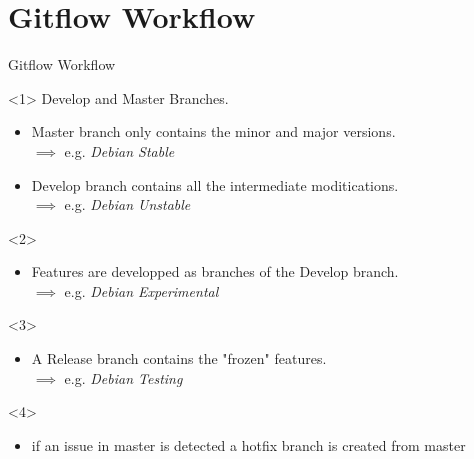 \documentclass[usenames,dvipsnames,9pt]{beamer}
\begin{document}
%
%
\section{Gitflow Workflow}

%
\begin{frame}[t]{Gitflow Workflow}
  \begin{center}

    \begin{onlyenv}<1>
      Develop and Master Branches.
      \begin{itemize}
        \item Master branch only contains the minor and major versions.\\
        $\implies$ e.g. \emph{Debian Stable}
        \item Develop branch contains all the intermediate moditications.\\
        $\implies$ e.g. \emph{Debian Unstable}
      \end{itemize}
    \end{onlyenv}
    \begin{onlyenv}<2>
      \begin{itemize}
        \item Features are developped as branches of the Develop branch.\\
        $\implies$ e.g. \emph{Debian Experimental}
      \end{itemize}
    \end{onlyenv}
    \begin{onlyenv}<3>
      \begin{itemize}
        \item A Release branch contains the "frozen" features.\\
        $\implies$ e.g. \emph{Debian Testing}
      \end{itemize}
    \end{onlyenv}
    \begin{onlyenv}<4>
      \begin{itemize}
        \item if an issue in master is detected a hotfix branch is created from master
      \end{itemize}
    \end{onlyenv}
  \end{center}
\end{frame}
\end{document}
